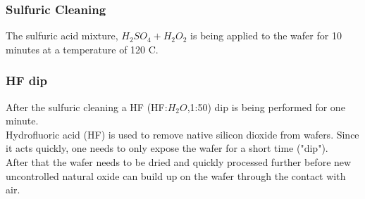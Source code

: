 \subsubsection{Sulfuric Cleaning}
The sulfuric acid mixture, $H_2 S O_4 + H_2 O_2$ is being applied to the wafer for 10 minutes at a temperature of 120 \degree C.

\subsubsection{HF dip}
After the sulfuric cleaning a HF (HF:$H_2O$,1:50) dip is being performed for one minute. \\
Hydrofluoric acid (HF) is used to remove native silicon dioxide from wafers. Since it acts quickly, one needs to only expose the wafer for a short time ("dip"). \\
After that the wafer needs to be dried and quickly processed further before new uncontrolled natural oxide can build up on the wafer through the contact with air.